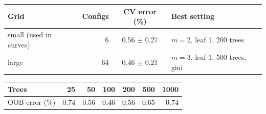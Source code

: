 \begin{tabular}{lrcl}
\toprule
Grid & Configs & CV error (\%) & Best setting \\
\midrule
small (used in curves) & 6 & 0.56 $\pm$ 0.27 & $m=2$, leaf 1, 200 trees \\
large & 64 & 0.46 $\pm$ 0.21 & $m=3$, leaf 1, 500 trees, gini \\
\bottomrule
\end{tabular}

\vspace{4pt}
\begin{tabular}{lrrrrrr}
\toprule
Trees & 25 & 50 & 100 & 200 & 500 & 1000 \\
\midrule
OOB error (\%) & 0.74 & 0.56 & 0.46 & 0.56 & 0.65 & 0.74 \\
\bottomrule
\end{tabular}

